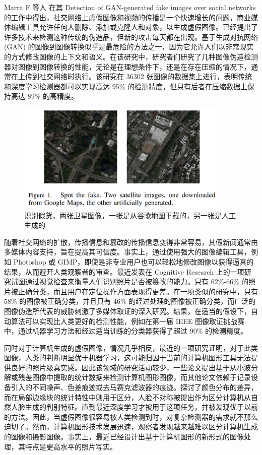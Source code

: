 Marra F 等人 \cite{marra2018detection} 在其 Detection of GAN-generated fake images over social networks 的工作中得出，社交网络上虚假图像和视频的传播是一个快速增长的问题，商业媒体编辑工具允许任何人删除、添加或克隆人和对象，以生成虚假图像。已经提出了许多技术来检测这种传统的伪造品，但新的攻击每天都在出现。基于生成对抗网络 (GAN) 的图像到图像转换似乎是最危险的方法之一，因为它允许人们以非常现实的方式修改图像的上下文和语义。在该研究中，研究者们研究了几种图像伪造检测器对图像到图像转换的性能，无论是在理想条件下，还是在存在压缩的情况下，通常在上传到社交网络时执行。该研究在 36302 张图像的数据集上进行，表明传统和深度学习检测器都可以实现高达 95\% 的检测精度，但只有后者在压缩数据上保持高达 89\% 的高精度。

\begin{figure}[htb]
\centering 
\includegraphics[width=0.90\textwidth]{img/p6m1.png} 
\caption{识别假货。两张卫星图像，一张是从谷歌地图下载的，另一张是人工生成的}
\label{Test}
\end{figure}

随着社交网络的扩散，传播信息和篡改的传播信息变得非常容易，其假新闻通常由多媒体内容支持，旨在提高其可信度。事实上，通过使用强大的图像编辑工具，例如 Photoshop 或 GIMP，即使是非专业用户也可以轻松地修改图像以获得逼真的结果，从而避开人类观察者的审查。最近发表在 Cognitive Research 上的一项研究试图通过视觉检查来衡量人们识别照片是否被篡改的能力。只有 62\%-66\% 的照片被正确分类，而且用户在定位操作方面表现得更差。在一项类似的研究中，只有 58\% 的图像被正确分类，并且只有 46\% 的经过处理的图像被正确分类，而广泛的图像伪造所代表的威胁刺激了多媒体取证的深入研究。结果，在适当的假设下，自动算法可以实现比人类更好的检测性能，例如在第一届 IEEE 图像取证挑战赛中，通过机器学习方法和经过适当训练的分类器获得了超过 90\% 的检测精度。

同时对于计算机生成的虚假图像，情况几乎相反，最近的一项研究证明，对于此类图像，人类的判断明显优于机器学习，这可能归因于当前的计算机图形工具无法提供良好的照片级真实感。因此该领域的研究活动较少，一些论文提出基于从小波分解或残差图像中提取的统计数据来检测计算机图形图像，而其他论文依赖于记录设备引入的不同噪声、色差痕迹或去马赛克滤波器的痕迹。探讨了颜色分布的差异，而在局部边缘块的统计特性中则用于区分，人脸不对称被提出作为区分计算机从自然人脸生成的判别特征。直到最近深度学习才被用于这项任务，并被发现优于以前的方法。因此，当虚假图像很容易被人类检测到时，对复杂检测器的需求就不那么迫切了。然而，计算机图形技术发展迅速，观察者发现越来越难以区分计算机生成的图像和摄影图像。事实上，最近已经设计出基于计算机图形的新形式的图像处理，其特点是更高水平的照片写实。

